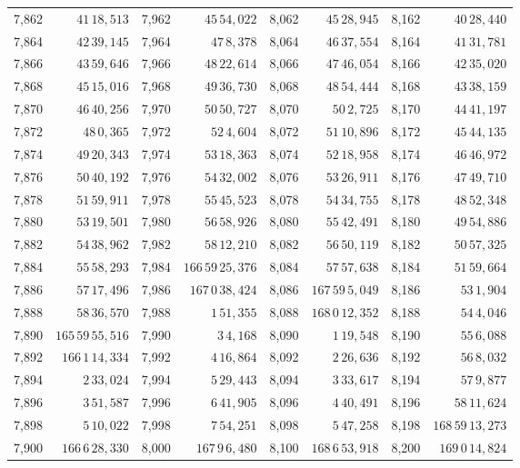 \begin{tabular}{|r|r||r|r||r|r||r|r|}
7,862 & \(41\,18,\!513\) & 7,962 & \(45\,54,\!022\) & 8,062 & \(45\,28,\!945\) & 8,162 & \(40\,28,\!440\) \\
7,864 & \(42\,39,\!145\) & 7,964 & \(47\,8,\!378\) & 8,064 & \(46\,37,\!554\) & 8,164 & \(41\,31,\!781\) \\
7,866 & \(43\,59,\!646\) & 7,966 & \(48\,22,\!614\) & 8,066 & \(47\,46,\!054\) & 8,166 & \(42\,35,\!020\) \\
7,868 & \(45\,15,\!016\) & 7,968 & \(49\,36,\!730\) & 8,068 & \(48\,54,\!444\) & 8,168 & \(43\,38,\!159\) \\
7,870 & \(46\,40,\!256\) & 7,970 & \(50\,50,\!727\) & 8,070 & \(50\,2,\!725\) & 8,170 & \(44\,41,\!197\) \\[1pt]
7,872 & \(48\,0,\!365\) & 7,972 & \(52\,4,\!604\) & 8,072 & \(51\,10,\!896\) & 8,172 & \(45\,44,\!135\) \\
7,874 & \(49\,20,\!343\) & 7,974 & \(53\,18,\!363\) & 8,074 & \(52\,18,\!958\) & 8,174 & \(46\,46,\!972\) \\
7,876 & \(50\,40,\!192\) & 7,976 & \(54\,32,\!002\) & 8,076 & \(53\,26,\!911\) & 8,176 & \(47\,49,\!710\) \\
7,878 & \(51\,59,\!911\) & 7,978 & \(55\,45,\!523\) & 8,078 & \(54\,34,\!755\) & 8,178 & \(48\,52,\!348\) \\
7,880 & \(53\,19,\!501\) & 7,980 & \(56\,58,\!926\) & 8,080 & \(55\,42,\!491\) & 8,180 & \(49\,54,\!886\) \\[1pt]
7,882 & \(54\,38,\!962\) & 7,982 & \(58\,12,\!210\) & 8,082 & \(56\,50,\!119\) & 8,182 & \(50\,57,\!325\) \\
7,884 & \(55\,58,\!293\) & 7,984 & \(166\,59\,25,\!376\) & 8,084 & \(57\,57,\!638\) & 8,184 & \(51\,59,\!664\) \\
7,886 & \(57\,17,\!496\) & 7,986 & \(167\,0\,38,\!424\) & 8,086 & \(167\,59\,5,\!049\) & 8,186 & \(53\,1,\!904\) \\
7,888 & \(58\,36,\!570\) & 7,988 & \(1\,51,\!355\) & 8,088 & \(168\,0\,12,\!352\) & 8,188 & \(54\,4,\!046\) \\
7,890 & \(165\,59\,55,\!516\) & 7,990 & \(3\,4,\!168\) & 8,090 & \(1\,19,\!548\) & 8,190 & \(55\,6,\!088\) \\[1pt]
7,892 & \(166\,1\,14,\!334\) & 7,992 & \(4\,16,\!864\) & 8,092 & \(2\,26,\!636\) & 8,192 & \(56\,8,\!032\) \\
7,894 & \(2\,33,\!024\) & 7,994 & \(5\,29,\!443\) & 8,094 & \(3\,33,\!617\) & 8,194 & \(57\,9,\!877\) \\
7,896 & \(3\,51,\!587\) & 7,996 & \(6\,41,\!905\) & 8,096 & \(4\,40,\!491\) & 8,196 & \(58\,11,\!624\) \\
7,898 & \(5\,10,\!022\) & 7,998 & \(7\,54,\!251\) & 8,098 & \(5\,47,\!258\) & 8,198 & \(168\,59\,13,\!273\) \\
7,900 & \(166\,6\,28,\!330\) & 8,000 & \(167\,9\,6,\!480\) & 8,100 & \(168\,6\,53,\!918\) & 8,200 & \(169\,0\,14,\!824\) \\
\hline
\end{tabular}\par
\endgroup
\clearpage
